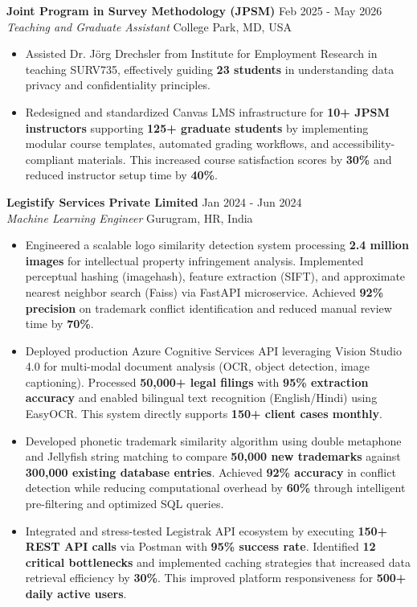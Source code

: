 \documentclass[11pt,letterpaper]{article}
\newcommand{\cventry}[4]{
    \noindent\textbf{#1} \hfill #2\\
    \textit{#3} \hfill #4\\[4pt]
}
\begin{document}
\cventry{Joint Program in Survey Methodology (JPSM)}{Feb 2025 - May 2026}{Teaching and Graduate Assistant}{College Park, MD, USA}
\begin{itemize}[leftmargin=16pt, noitemsep, topsep=2pt]
    \item Assisted Dr. Jörg Drechsler from Institute for Employment Research in teaching SURV735, effectively guiding \textbf{23 students} in understanding data privacy and confidentiality principles.
    
    \item Redesigned and standardized Canvas LMS infrastructure for \textbf{10+ JPSM instructors} supporting \textbf{125+ graduate students} by implementing modular course templates, automated grading workflows, and accessibility-compliant materials. This increased course satisfaction scores by \textbf{30\%} and reduced instructor setup time by \textbf{40\%}.
\end{itemize}

\cventry{Legistify Services Private Limited}{Jan 2024 - Jun 2024}{Machine Learning Engineer}{Gurugram, HR, India}
\begin{itemize}[leftmargin=16pt, noitemsep, topsep=2pt]
    \item Engineered a scalable logo similarity detection system processing \textbf{2.4 million images} for intellectual property infringement analysis. Implemented perceptual hashing (imagehash), feature extraction (SIFT), and approximate nearest neighbor search (Faiss) via FastAPI microservice. Achieved \textbf{92\% precision} on trademark conflict identification and reduced manual review time by \textbf{70\%}.
    
    \item Deployed production Azure Cognitive Services API leveraging Vision Studio 4.0 for multi-modal document analysis (OCR, object detection, image captioning). Processed \textbf{50,000+ legal filings} with \textbf{95\% extraction accuracy} and enabled bilingual text recognition (English/Hindi) using EasyOCR. This system directly supports \textbf{150+ client cases monthly}.
    
    \item Developed phonetic trademark similarity algorithm using double metaphone and Jellyfish string matching to compare \textbf{50,000 new trademarks} against \textbf{300,000 existing database entries}. Achieved \textbf{92\% accuracy} in conflict detection while reducing computational overhead by \textbf{60\%} through intelligent pre-filtering and optimized SQL queries.
    
    \item Integrated and stress-tested Legistrak API ecosystem by executing \textbf{150+ REST API calls} via Postman with \textbf{95\% success rate}. Identified \textbf{12 critical bottlenecks} and implemented caching strategies that increased data retrieval efficiency by \textbf{30\%}. This improved platform responsiveness for \textbf{500+ daily active users}.
\end{itemize}
\end{document}
